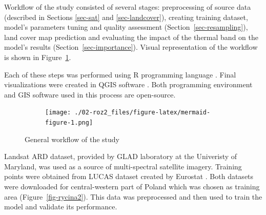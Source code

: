 \documentclass{amuthesis}
\begin{document}
Workflow of the study consisted of several stages: preprocessing of
source data (described in Sections \ref{sec-sat} and
\ref{sec-landcover}), creating training dataset, model's parameters
tuning and quality assessment (Section~\ref{sec-resampling}), land cover
map prediction and evaluating the impact of the thermal band on the
model's results (Section~\ref{sec-importance}). Visual representation of
the workflow is shown in Figure~\ref{fig-rycina1}.

Each of these steps was performed using R programming language
\autocite{R-base}. Final visualizations were created in QGIS software
\autocite{qgis_development_team_qgis_2009}. Both programming environment
and GIS software used in this process are open-source.

\begin{figure}

{\centering 

\begin{figure}[H]

{\centering \texttt{[image: ./02-roz2\_files/figure-latex/mermaid-figure-1.png]}

}

\end{figure}

}

\caption{\label{fig-rycina1}General workflow of the study}

\end{figure}

Landsat ARD dataset, provided by GLAD laboratory at the Univeristy of
Maryland, was used as a source of multi-spectral satellite imagery.
Training points were obtained from LUCAS dataset created by Eurostat
\autocite{dandrimont_harmonised_2020}. Both datasets were downloaded for
central-western part of Poland which was chosen as training area
(Figure~\ref{fig-rycina2}). This data was preprocessed and then used to
train the model and validate its performance.
\end{document}
